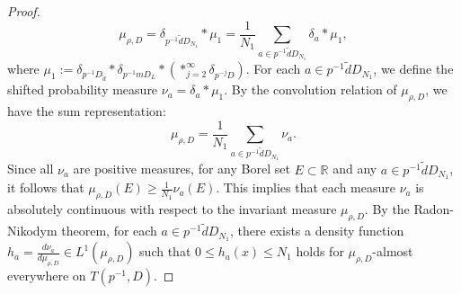 \documentclass[10pt,a4paper]{amsart}
\begin{document}
\begin{proof}
\begin{equation*}
	\mu_{\rho,D} = \delta_{p^{-1}\tilde{d}D_{N_1}} \ast \mu_1 = \frac{1}{N_1} \sum_{a \in p^{-1}\tilde{d}D_{N_1}} \delta_a \ast \mu_1,
\end{equation*}
where $\mu_1:=\delta_{p^{-1}D_{\tilde{d}}} \ast \delta_{p^{-1} mD_{L}} \ast (\ast^{\infty}_{j=2} \delta_{p^{-j}D}).$
For each $a \in p^{-1}\tilde{d}D_{N_1}$, we define the shifted probability measure $\nu_a = \delta_a \ast \mu_1$. By the convolution relation of $\mu_{\rho,D}$, we have the sum representation:
\begin{equation*}
	\mu_{\rho,D} = \frac{1}{N_1} \sum_{a \in p^{-1}\tilde{d}D_{N_1}} \nu_a.
\end{equation*}
Since all $\nu_a$ are positive measures, for any Borel set $E \subset \mathbb{R}$ and any $a\in p^{-1}\tilde{d}D_{N_1}$, it follows that $\mu_{\rho,D}(E) \ge \frac{1}{N_1} \nu_a(E)$. This implies that each measure $\nu_a$ is absolutely continuous with respect to the invariant measure $\mu_{\rho,D}$.
By the Radon-Nikodym theorem, for each $a\in p^{-1}\tilde{d}D_{N_1}$, there exists a density function $h_a = \frac{d\nu_a}{d\mu_{\rho,D}} \in L^1(\mu_{\rho,D})$ such that $0 \le h_a(x) \le N_1$ holds for $\mu_{\rho,D}$-almost everywhere on $ T(p^{-1},D)$.


\end{proof}
\end{document}
